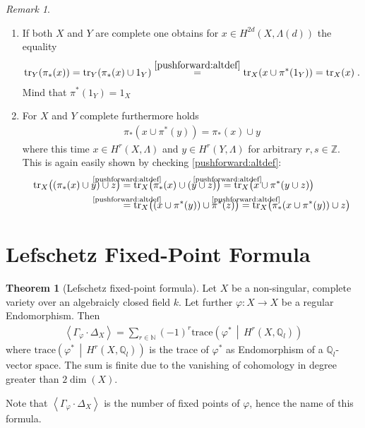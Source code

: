 \documentclass[english]{scrartcl}
\theoremstyle{definition}
\newtheorem{Thm}[Def]{Theorem}
\theoremstyle{remark}
\newtheorem{Rem}[Def]{Remark}
\newcommand*{\N}{\mathds{N}}
\newcommand*{\Z}{\mathds{Z}}
\newcommand*{\Q}{\mathds{Q}}
\newcommand*{\Zl}{\Z_l} %
\newcommand*{\Ql}{\Q_l} %
\newcommand*{\Tr}{\text{tr}} %
\newcommand*{\intProd}[2]{{#1\cdot#2}} %
\newcommand*{\intNum}[1]{{\left\langle{#1}\right\rangle}} %
\newcommand*{\Graph}[1]{{\Gamma_{#1}}} %
\newcommand*{\Diag}[1]{{\Delta_{#1}}} %
\newcommand*{\trace}[2]{{\text{trace}\left(#1 \,\middle|\, #2 \right)}} %
\newcommand*{\one}[1]{{1_{#1}}}%
\renewcommand*{\phi}{\varphi}
\begin{document}
\begin{Rem}
\begin{enumerate}[label=(P\arabic*)]
  \item\label{pushforward:trace}
    If both $X$ and $Y$ are complete one obtains for
    $x\in H^{2d}(X,\Lambda(d))$ the equality
    \begin{gather*}
      \Tr_Y(\pi_*(x))
      = \Tr_Y(\pi_*(x)\cup \one{Y})
      \overset{\ref{pushforward:altdef}}= \Tr_X(x\cup\pi^*(\one{Y}))
      = \Tr_X(x)
      \;.
    \end{gather*}
    Mind that $\pi^*(\one{Y})=\one{X}$
    \cite[compare][Rem.~V.11.6.]{milnebook} %
  \item
    For $X$ and $Y$ complete furthermore holds
    \begin{gather}
      \tag{Projection Formula}\label{pushforward:projectionformula}
      \pi_*(x\cup \pi^*(y)) = \pi_*(x)\cup y
    \end{gather}
    where this time $x\in H^r(X,\Lambda)$ and $y\in H^r(Y,\Lambda)$
    for arbitrary $r,s\in\Z$. This is again easily shown by checking
    \ref{pushforward:altdef}:
    \begin{align*}
      \Tr_X\big((\pi_*(x)\cup y) \cup z\big)
      &\overset{\mathclap{\text{\ref{pushforward:altdef}}}}=
      \Tr_X\big(\pi_*(x)\cup (y \cup z)\big)
      \overset{\mathclap{\text{\ref{pushforward:altdef}}}}=
      \Tr_X\big( x\cup \pi^*(y\cup z)\big)\\
      &\overset{\mathclap{\text{\ref{pushforward:altdef}}}}=
      \Tr_X\big( (x\cup \pi^*(y)) \cup \pi^*(z) \big)
      \overset{\mathclap{\text{\ref{pushforward:altdef}}}}=
      \Tr_X\big( \pi_*(x\cup \pi^*(y)) \cup z\big)
    \end{align*}
  \end{enumerate}
\end{Rem}

\section{Lefschetz Fixed-Point Formula}

\begin{Thm}[Lefschetz fixed-point formula]\label{lefschetzthm}
  Let $X$ be a non-singular, complete variety over an algebraicly
  closed field $k$.
  Let further $\phi\colon X\to X$ be a regular Endomorphism.
  Then
  \begin{gather*}
    \intNum{\intProd{\Graph{\phi}}{\Diag{X}}}
    = \sum_{r\in\N} (-1)^r \trace{\phi^*}{H^r(X,\Ql)}
  \end{gather*}
  where $\trace{\phi^*}{H^r(X,\Ql)}$ is the trace of $\phi^*$ as
  Endomorphism of a $\Ql$-vector space. 
  The sum is finite due to the vanishing
  of cohomology in degree greater than $2\dim(X)$. 
\end{Thm}
Note that $\intNum{\intProd{\Graph{\phi}}{\Diag{X}}}$ is the number of
fixed points of $\phi$, hence the name of this formula.
\end{document}
